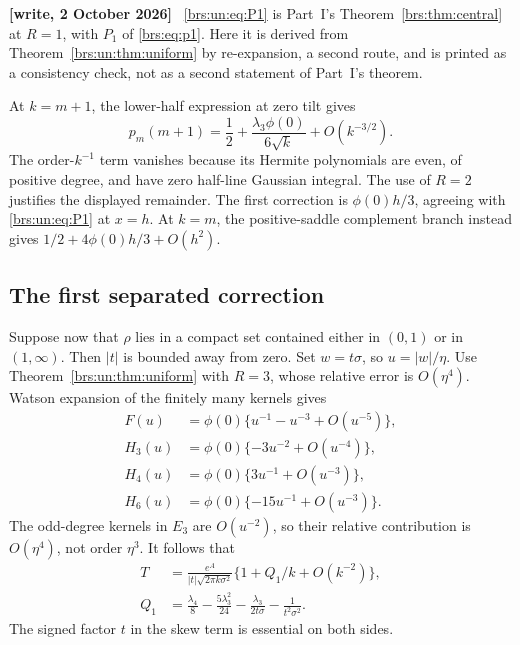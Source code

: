 \documentclass[11pt]{article}
\numberwithin{equation}{section}
\theoremstyle{remark}\newtheorem{remark}[theorem]{Remark}
\newenvironment{writenote}{\par\smallskip\begingroup\small\noindent\textbf{[write, 2 October 2026]}\ }{\par\endgroup\smallskip}
\begin{document}
\begin{writenote}
\eqref{brs:un:eq:P1} is Part~I's Theorem~\ref{brs:thm:central} at $R=1$, with $P_1$ of \eqref{brs:eq:p1}. Here it is derived from Theorem~\ref{brs:un:thm:uniform} by re-expansion, a second route, and is printed as a consistency check, not as a second statement of Part~I's theorem.
\end{writenote}

At $k=m+1$, the lower-half expression at zero tilt gives
\begin{equation}\label{brs:un:eq:mean}
 p_m(m+1)=\frac12+\frac{\lambda_3\phi(0)}{6\sqrt k}
                      +O(k^{-3/2}).
\end{equation}
The order-$k^{-1}$ term vanishes because its Hermite polynomials are
even, of positive degree, and have zero half-line Gaussian integral.
The use of $R=2$ justifies the displayed remainder.
The first correction is $\phi(0)h/3$, agreeing with
\eqref{brs:un:eq:P1} at $x=h$.  At $k=m$, the positive-saddle complement
branch instead gives $1/2+4\phi(0)h/3+O(h^2)$.

\subsection{The first separated correction}

Suppose now that $\rho$ lies in a compact set contained either in
$(0,1)$ or in $(1,\infty)$.  Then $|t|$ is bounded away from zero.
Set $w=t\sigma$, so $u=|w|/\eta$.  Use
Theorem~\ref{brs:un:thm:uniform} with $R=3$, whose relative error is
$O(\eta^4)$.  Watson expansion of the finitely many kernels gives
\begin{align}\label{brs:un:eq:watson}
 F(u)&=\phi(0)\{u^{-1}-u^{-3}+O(u^{-5})\},\\
 H_3(u)&=\phi(0)\{-3u^{-2}+O(u^{-4})\},\nonumber\\
 H_4(u)&=\phi(0)\{3u^{-1}+O(u^{-3})\},\nonumber\\
 H_6(u)&=\phi(0)\{-15u^{-1}+O(u^{-3})\}.\nonumber
\end{align}
The odd-degree kernels in $E_3$ are $O(u^{-2})$, so their relative
contribution is $O(\eta^4)$, not order $\eta^3$.  It follows that
\begin{align}\label{brs:un:eq:Q1}
 T&=\frac{e^A}{|t|\sqrt{2\pi k\sigma^2}}
         \{1+Q_1/k+O(k^{-2})\},\\
 Q_1&=\frac{\lambda_4}{8}-\frac{5\lambda_3^2}{24}
       -\frac{\lambda_3}{2t\sigma}-\frac{1}{t^2\sigma^2}.
       \nonumber
\end{align}
The signed factor $t$ in the skew term is essential on both sides.
\end{document}

